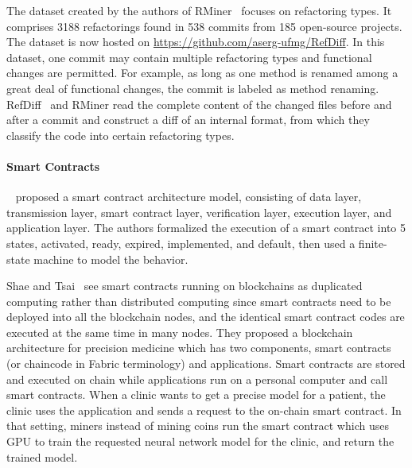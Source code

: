 The dataset created by the authors of RMiner~\cite{tsantalis2018accurate} focuses on refactoring types. It comprises \num{3188} refactorings found in 538 commits from 185 open-source projects. The dataset is now hosted on \url{https://github.com/aserg-ufmg/RefDiff}. In this dataset, one commit may contain multiple refactoring types and functional changes are permitted. For example, as long as one method is renamed among a great deal of functional changes, the commit is labeled as method renaming.
RefDiff~\cite{silva2020refdiff} and RMiner read the complete content of the changed files before and after a commit and construct a diff of an internal format, from which they classify the code into certain refactoring types.





\paragraph*{Smart Contracts}

~\cite{yang2020implementation} proposed a smart contract architecture model, consisting of data layer, transmission layer, smart contract layer, verification layer, execution layer, and application layer. The authors formalized the execution of a smart contract into 5 states, activated, ready, expired, implemented, and default, then used a finite-state machine to model the behavior.

Shae and Tsai~\cite{shae2018transform} see smart contracts running on blockchains as duplicated computing rather than distributed computing
since smart contracts need to be deployed into all the blockchain nodes, and the identical smart contract codes are executed at the same time in many nodes.
They proposed a blockchain architecture for precision medicine which has two components, smart contracts (or chaincode in Fabric terminology) and applications.
Smart contracts are stored and executed on chain while applications run on a personal computer and call smart contracts.
When a clinic wants to get a precise model for a patient, the clinic uses the application and sends a request to the on-chain smart contract. In that setting, miners instead of mining coins run the smart contract which uses GPU to train the requested neural network model for the clinic, and return the trained model.


